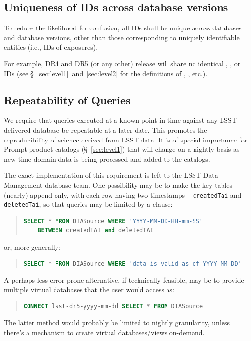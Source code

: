 \documentclass[SE,lsstdraft,toc]{lsstdoc}
\begin{document}
\subsection{Uniqueness of IDs across database versions}

To reduce the likelihood for confusion, all IDs shall be unique across databases and database versions, other than those corresponding to uniquely identifiable entities (i.e., IDs of exposures).

For example, DR4 and DR5 (or any other) release will share no identical \Object, \Source, \DIAObject or \DIASource IDs (see \S~\ref{sec:level1}~and~\ref{sec:level2} for the definitions of \Objects, \DIAObjects, etc.).

\subsection{Repeatability of Queries}

We require that queries executed at a known point in time against any LSST-delivered database be repeatable at a later date. This promotes the reproducibility of science derived from LSST data. It is of special importance for Prompt product catalogs (\S~\ref{sec:level1}) that will change on a nightly basis as new time domain data is being processed and added to the catalogs.

The exact implementation of this requirement is left to the LSST Data Management database team. One possibility may be to make the key tables (nearly) append-only, with each row having two timestamps -- \texttt{createdTai} and \texttt{deletedTai}, so that queries may be limited by a  clause:
\begin{quote}
\item \begin{lstlisting}[language=SQL]
SELECT * FROM DIASource WHERE 'YYYY-MM-DD-HH-mm-SS'
    BETWEEN createdTAI and deletedTAI
\end{lstlisting}
\end{quote}
%
or, more generally:
%
\begin{quote}
\item \begin{lstlisting}[language=SQL,showstringspaces=false]
SELECT * FROM DIASource WHERE 'data is valid as of YYYY-MM-DD'
\end{lstlisting}
\end{quote}
%
A perhaps less error-prone alternative, if technically feasible, may be to provide multiple virtual databases that the user would access as:
%
\begin{quote}
\item \begin{lstlisting}[language=SQL]
CONNECT lsst-dr5-yyyy-mm-dd SELECT * FROM DIASource
\end{lstlisting}
\end{quote}
%
The latter method would probably be limited to nightly granularity, unless there's a mechanism to create virtual databases/views on-demand.
\end{document}
